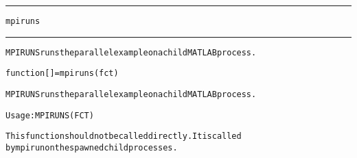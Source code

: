 \begin{samepage}
\hrule
\begin{center}
{\large \verb!mpiruns!}
\label{p:mpiruns}
\end{center}
\hrule\vspace{0.1in}



\begin{alltt}
MPIRUNS runs the parallel example on a child MATLAB process.
\end{alltt}

\end{samepage}



\begin{samepage}


\begin{alltt}
function [] = mpiruns(fct) 
\end{alltt}

\end{samepage}



\begin{alltt}
MPIRUNS runs the parallel example on a child MATLAB process.

  Usage: MPIRUNS ( FCT )

  This function should not be called directly. It is called
  by mpirun on the spawned child processes.
\end{alltt}






\vspace{0.1in}
